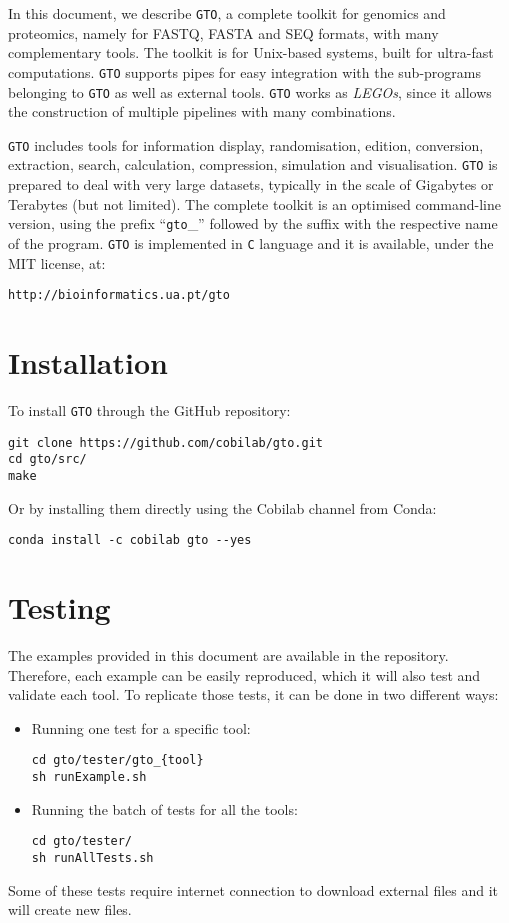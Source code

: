 In this document, we describe \texttt{GTO}, a complete toolkit for genomics and proteomics, namely for FASTQ, FASTA and SEQ formats, with many complementary tools. The toolkit is for Unix-based systems, built for ultra-fast computations. \texttt{GTO} supports pipes for easy integration with the sub-programs belonging to \texttt{GTO} as well as external tools. \texttt{GTO} works as \textit{LEGOs}, since it allows the construction of multiple pipelines with many combinations.

\texttt{GTO} includes tools for information display, randomisation, edition, conversion, extraction, search, calculation, compression, simulation and visualisation. \texttt{GTO} is prepared to deal with very large datasets, typically in the scale of Gigabytes or Terabytes (but not limited).
The complete toolkit is an optimised command-line version, using the prefix ``\texttt{gto}\_'' followed by the suffix with the respective name of the program. \texttt{GTO} is implemented in \texttt{C} language and it is available, under the MIT license, at:
\begin{lstlisting}
http://bioinformatics.ua.pt/gto
\end{lstlisting}

\section{Installation}
To install \texttt{GTO} through the GitHub repository:
\begin{lstlisting}
git clone https://github.com/cobilab/gto.git
cd gto/src/
make
\end{lstlisting}
Or by installing them directly using the Cobilab channel from Conda:
\begin{lstlisting}
conda install -c cobilab gto --yes
\end{lstlisting}


\section{Testing}
The examples provided in this document are available in the repository. Therefore, each example can be easily reproduced, which it will also test and validate each tool. To replicate those tests, it can be done in two different ways: 
\begin{itemize}
	\item Running one test for a specific tool:
\begin{lstlisting}
cd gto/tester/gto_{tool}
sh runExample.sh
\end{lstlisting}
\item Running the batch of tests for all the tools:
\begin{lstlisting}
cd gto/tester/
sh runAllTests.sh
\end{lstlisting}
\end{itemize}
Some of these tests require internet connection to download external files and it will create new files.

